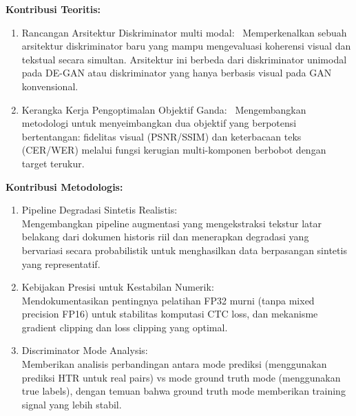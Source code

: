 \documentclass[12pt,a4paper]{article}
\begin{document}
\textbf{Kontribusi Teoritis:}
\begin{enumerate}[label=\arabic*., leftmargin=1cm]
    \item Rancangan Arsitektur Diskriminator multi modal: \
    Memperkenalkan sebuah arsitektur diskriminator baru yang mampu mengevaluasi koherensi visual dan tekstual secara simultan. Arsitektur ini berbeda dari diskriminator unimodal pada DE-GAN atau diskriminator yang hanya berbasis visual pada GAN konvensional.

    \item Kerangka Kerja Pengoptimalan Objektif Ganda: \
    Mengembangkan metodologi untuk menyeimbangkan dua objektif yang berpotensi bertentangan: fidelitas visual (PSNR/SSIM) dan keterbacaan teks (CER/WER) melalui fungsi kerugian multi-komponen berbobot dengan target terukur.


\end{enumerate}

\vspace{0.5em}
\textbf{Kontribusi Metodologis:}
\begin{enumerate}[label=\arabic*., leftmargin=1cm]
    \item Pipeline Degradasi Sintetis Realistis: \\
    Mengembangkan pipeline augmentasi yang  mengekstraksi tekstur latar belakang dari dokumen historis riil dan menerapkan degradasi yang bervariasi secara probabilistik untuk menghasilkan data berpasangan sintetis yang representatif.

    \item Kebijakan Presisi untuk Kestabilan Numerik: \\
    Mendokumentasikan pentingnya pelatihan FP32 murni  (tanpa mixed precision FP16) untuk stabilitas komputasi CTC loss, dan  mekanisme gradient clipping dan loss clipping yang optimal.

    \item Discriminator Mode Analysis: \\
    Memberikan analisis perbandingan antara mode prediksi (menggunakan prediksi HTR  untuk real pairs) vs mode ground truth mode (menggunakan true labels), dengan temuan bahwa ground truth mode memberikan training signal yang lebih stabil.
\end{enumerate}
\end{document}
